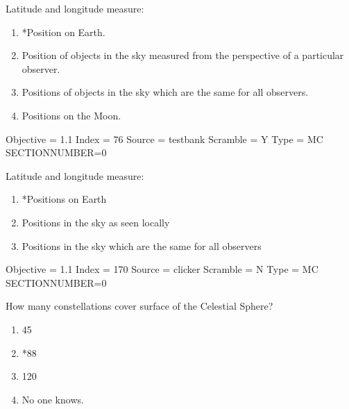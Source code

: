 \documentclass[11pt]{article}
\begin{document}
\begin{enumerate}
\setlength{\itemsep}{1pt} 
\setlength{\parskip}{0pt} 
\setlength{\parsep}{0pt}
\setlength{\multicolsep}{1pt} 

\begin{minipage}{\textwidth}
\begin{minipage}{\textwidth}
\item Latitude and longitude measure:
\begin{enumerate} 
\setlength{\itemsep}{1pt} 
\setlength{\parskip}{0pt} 
\setlength{\parsep}{0pt}
\setlength{\multicolsep}{1pt} 
\item *Position on Earth.
\item Position of objects in the sky measured from the perspective of a particular observer.
\item Positions of objects in the sky which are the same for all observers.
\item Positions on the Moon.
\end{enumerate} 
Objective = 1.1
Index = 76
Source = testbank
Scramble = Y
Type = MC
SECTIONNUMBER=0
\end{minipage}
\end{minipage}
\vskip 0.20in

\begin{minipage}{\textwidth}
\begin{minipage}{\textwidth}
\item Latitude and longitude measure:
\begin{enumerate} 
\setlength{\itemsep}{1pt} 
\setlength{\parskip}{0pt} 
\setlength{\parsep}{0pt}
\setlength{\multicolsep}{1pt} 
\item *Positions on Earth
\item Positions in the sky as seen locally
\item Positions in the sky which are the same for all observers
\end{enumerate} 
Objective = 1.1
Index = 170
Source = clicker
Scramble = N
Type = MC
SECTIONNUMBER=0
\end{minipage}
\end{minipage}
\vskip 0.20in

\begin{minipage}{\textwidth}
\begin{minipage}{\textwidth}
\item How many constellations cover surface of the Celestial Sphere?
\begin{multicols}{3}
\begin{enumerate} 
\setlength{\itemsep}{1pt} 
\setlength{\parskip}{0pt} 
\setlength{\parsep}{0pt}
\setlength{\multicolsep}{1pt} 
\item 45
\item *88
\item 120
\item No one knows.
\end{enumerate} 
\vfill 
\end{multicols}


\end{minipage}
\end{minipage}
\end{enumerate}
\end{document}
